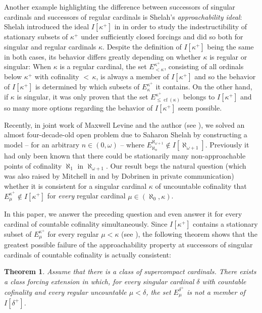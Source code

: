 \documentclass[a4paper]{amsart}
\theoremstyle{definition}
\theoremstyle{remark}
\theoremstyle{plain}
\newtheorem*{mysenx}{Theorem}
\numberwithin{mydef}{section}
\DeclareMathOperator{\cf}{cf}
\begin{document}
	Another example highlighting the difference between successors of singular cardinals and successors of regular cardinals is Shelah's \emph{approachability ideal}: Shelah introduced the ideal $I[\kappa^+]$ in \cite{ShelahSuccSingCard} in order to study the indestructibility of stationary subsets of $\kappa^+$ under sufficiently closed forcings and did so both for singular and regular cardinals $\kappa$. Despite the definition of $I[\kappa^+]$ being the same in both cases, its behavior differs greatly depending on whether $\kappa$ is regular or singular: When $\kappa$ is a regular cardinal, the set $E_{<\kappa}^{\kappa^+}$, consisting of all ordinals below $\kappa^+$ with cofinality ${<}\,\kappa$, is always a member of $I[\kappa^+]$ and so the behavior of $I[\kappa^+]$ is determined by which subsets of $E_{\kappa}^{\kappa^+}$ it contains. On the other hand, if $\kappa$ is singular, it was only proven that the set $E_{\leq\cf(\kappa)}^{\kappa^+}$ belongs to $I[\kappa^+]$ and so many more options regarding the behavior of $I[\kappa^+]$ seem possible.
	
	Recently, in joint work of Maxwell Levine and the author (see \cite{JakobLevineFailureApproachability}), we solved an almost four-decade-old open problem due to Saharon Shelah by constructing a model -- for an arbitrary $n\in(0,\omega)$ -- where $E_{\aleph_n}^{\aleph_{\omega+1}}\notin I[\aleph_{\omega+1}]$. Previously it had only been known that there could be stationarily many non-approachable points of cofinality $\aleph_1$ in $\aleph_{\omega+1}$. Our result begs the natural question (which was also raised by Mitchell in \cite{MitchellNonstationary} and by Dobrinen in private communication) whether it is consistent for a singular cardinal $\kappa$ of uncountable cofinality that $E_{\mu}^{\kappa^+}\notin I[\kappa^+]$ for \emph{every} regular cardinal $\mu\in(\aleph_0,\kappa)$.
	
	In this paper, we answer the preceding question and even answer it for every cardinal of countable cofinality simultaneously. Since $I[\kappa^+]$ contains a stationary subset of $E_{\mu}^{\kappa^+}$ for every regular $\mu<\kappa$ (see \cite[Theorem 9.2]{CummingsNotes}), the following theorem shows that the greatest possible failure of the approachability property at successors of singular cardinals of countable cofinality is actually consistent:
	
	\begin{mysenx}
		Assume that there is a class of supercompact cardinals. There exists a class forcing extension in which, for every singular cardinal $\delta$ with countable cofinality and every regular uncountable $\mu<\delta$, the set $E_{\mu}^{\delta^+}$ is not a member of $I[\delta^+]$.
	\end{mysenx}
	
\end{document}
